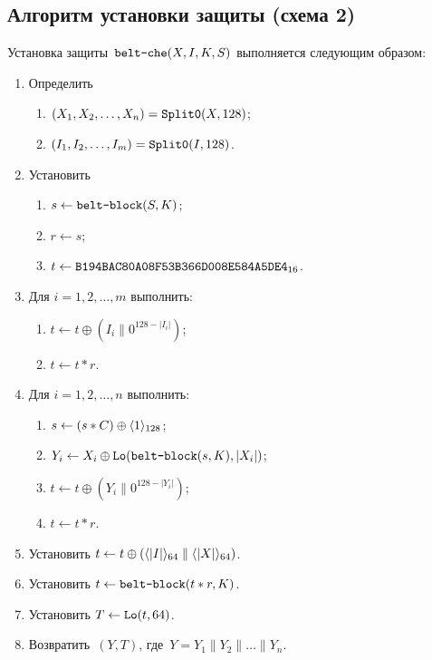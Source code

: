 \subsection{Алгоритм установки защиты (схема 2)}\label{AE.CHE.Wrap}

Установка защиты~$\texttt{belt-che}(X,I,K,S)$ выполняется следующим образом:
\begin{enumerate}
\item
Определить 
\begin{enumerate}
\item
$(X_1,X_2,\ldots,X_n)=\mathop{\texttt{Split0}}\nolimits(X, 128)$;
\item
$(I_1,I_2,\ldots,I_m)=\mathop{\texttt{Split0}}\nolimits(I, 128)$. 
\end{enumerate}
\item
Установить
\begin{enumerate}
\item
$s\leftarrow\texttt{belt-block}(S,K)$;
\item
$r\leftarrow s$;
\item
$t\leftarrow\texttt{B194BAC80A08F53B366D008E584A5DE4}_{16}$.
\end{enumerate}

\item
Для $i=1,2,\ldots,m$ выполнить:
\begin{enumerate}
\item
$t\leftarrow t\oplus (I_i\parallel 0^{128-|I_i|})$;
\item
$t\leftarrow t\ast r$.
\end{enumerate}

\item
Для $i=1,2,\ldots,n$ выполнить:
\begin{enumerate}
\item
$s\leftarrow (s\ast C)\oplus\langle1\rangle_{128}$;
\item
$Y_i\leftarrow X_i\oplus\mathop{\texttt{Lo}}\nolimits(\texttt{belt-block}(s,K), |X_i|)$;
\item
$t\leftarrow t\oplus (Y_i\parallel 0^{128-|Y_i|})$;
\item
$t\leftarrow t\ast r$.
\end{enumerate}

\item
Установить
$t\leftarrow t\oplus 
(\langle|I|\rangle_{64}\parallel\langle|X|\rangle_{64})$.
\item
Установить
$t\leftarrow \texttt{belt-block}(t\ast r,K)$.
\item
Установить
$T\leftarrow \mathop{\texttt{Lo}}\nolimits(t, 64)$.
\item
Возвратить~$(Y,T)$, 
где~$Y=Y_1\parallel Y_2\parallel\ldots\parallel Y_n$.
\end{enumerate}

